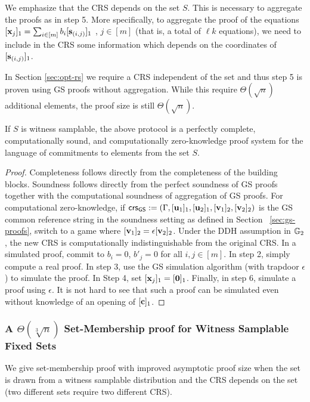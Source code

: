 We emphasize that the CRS depends on the set $S$. This is necessary to aggregate the proofs as in step 5. More  specifically, to aggregate the proof of the equations  $[\mathbf{x}_j]_1 = \sum_{i\in[m]}b_i [\mathbf{s}_{(i,j)}]_1$ , $j\in[m]$ (that is, a total of $\ell k$ equations), we need to include in the CRS some information which depends on the coordinates of $[\mathbf{s}_{(i,j)}]_1$.

In Section \ref{sec:opt-rs} we require a CRS independent of the set and thus step 5 is proven using GS proofs without aggregation. While this require $\Theta(\sqrt{n})$ additional elements, the proof size is still $\Theta(\sqrt{n})$.

\begin{theorem}\label{theo:listsquarevect}
If $S$ is witness samplable, the above protocol is a perfectly complete, computationally sound, and computationally zero-knowledge proof system for the language of commitments to elements from the set $S$.
\end{theorem}

\begin{proof} Completeness follows directly from the completeness of the 
building blocks. Soundness follows directly from the perfect soundness of GS proofs together with the computational soundness of aggregation of GS proofs. For computational zero-knowledge, if  
$\mathsf{crs}_{\mathsf{GS}}:=(\Gamma,[\mathbf{u}_1]_1,[\mathbf{u}_2]_1,[\mathbf{v}_1]_2,[\mathbf{v}_2]_2)$ is the GS common reference string in the soundness setting as defined in Section~ \ref{sec:gs-proofs}, switch to a game where $[\mathbf{v}_1]_2= \epsilon [\mathbf{v}_2]_2$. Under the DDH assumption in $\mathbb{G}_2$, the new CRS is computationally indistinguishable from the original CRS. In a simulated proof, commit to $b_i=0$, $b'_j=0$ for all $i,j \in [m]$. In step 2, simply compute a real proof. In step 3, use the GS simulation algorithm  (with trapdoor $\epsilon$) to simulate the proof. In Step 4, set $[\mathbf{x}_j]_1=[\mathbf{0}]_1$. Finally, in step 6, simulate a proof using $\epsilon$. It is not hard to see that such a proof can be simulated even without knowledge of an opening of $[\mathbf{c}]_1$. 
\end{proof}

\subsubsection{A $\Theta(\sqrt[3]{n})$ Set-Membership proof for Witness Samplable Fixed Sets} We give set-membership proof with improved asymptotic proof size when the set is drawn from a witness samplable distribution and the CRS depends on the set (two different sets require two different CRS).

